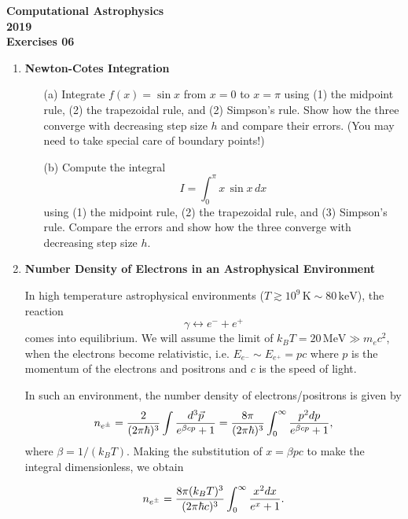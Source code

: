 \documentclass[11pt]{article}
\begin{document}
\begin{center}
\large \bf Computational Astrophysics \rm \\
2019\\
{\small Exercises 06}
\end{center}

\begin{enumerate}
\item {\bf Newton-Cotes Integration} 
\begin{enumerate}
\item[(a)] Integrate $f(x) = \sin{x}$ from $x = 0$ to $x = \pi$
  using (1) the midpoint rule, (2) the trapezoidal rule, and (2)
  Simpson's rule. Show how the three converge with decreasing step
  size $h$ and compare their errors. (You may need to take
  special care of boundary points!)
\item[(b)] Compute the integral
\begin{equation*}
I = \int_{0}^\pi x \, \sin{x}\, dx
\end{equation*}
using (1) the midpoint rule, (2) the trapezoidal rule, and (3)
Simpson's rule. Compare the errors and show how the three converge
with decreasing step size $h$.
\end{enumerate}


\item {\bf Number Density of Electrons in an Astrophysical Environment}

In high temperature astrophysical environments ($T \gtrsim 10^9\,\mathrm{K} \sim
80\,\mathrm{keV}$), the reaction 
\begin{equation}
\gamma \leftrightarrow e^- + e^+
\end{equation}
comes into equilibrium. We will assume the
limit of $k_B T = 20\,\mathrm{MeV} \gg m_ec^2$, when the electrons
become relativistic, i.e. $E_{e^-} \sim E_{e^+} = pc$ where $p$ is the
momentum of the electrons and positrons and $c$ is the speed of light.

In such an environment, the number density of electrons/positrons is given by
\begin{equation}
n_{e^\pm} = {2 \over (2\pi\hbar)^3}\int { d^3\vec{p} \over
  e^{\beta c p} + 1} = {8\pi \over (2\pi\hbar)^3}\int_0^\infty {p^2 dp \over
  e^{\beta c p} + 1},
\end{equation}
where $\beta = 1/(k_B T)$. Making the substitution of $x= \beta p c$ to make the integral
dimensionless, we obtain

\begin{equation}
n_{e^\pm}  =  {8\pi (k_BT)^3 \over (2\pi\hbar
  c)^3}\int_0^\infty  {x^2 dx \over
  e^{x} + 1}.
\end{equation}
 

\end{enumerate}
\end{document}
